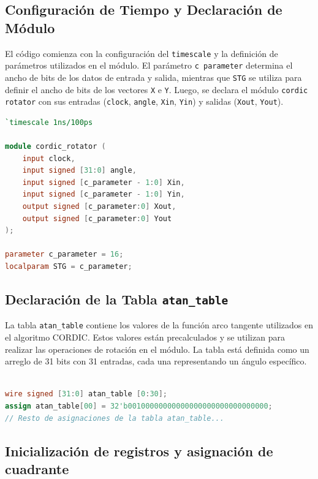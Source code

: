 \documentclass[12pt,a4paper, twoside]{article} %
\begin{document}
\subsection{Configuración de Tiempo y Declaración de Módulo}

El código comienza con la configuración del \texttt{timescale} y la definición de parámetros utilizados en el módulo. El parámetro \texttt{c parameter} determina el ancho de bits de los datos de entrada y salida, mientras que \texttt{STG} se utiliza para definir el ancho de bits de los vectores \texttt{X} e \texttt{Y}. Luego, se declara el módulo \texttt{cordic rotator} con sus entradas (\texttt{clock}, \texttt{angle}, \texttt{Xin}, \texttt{Yin}) y salidas (\texttt{Xout}, \texttt{Yout}).

\begin{lstlisting}[language=Verilog]
`timescale 1ns/100ps

module cordic_rotator (
    input clock,
    input signed [31:0] angle,
    input signed [c_parameter - 1:0] Xin,
    input signed [c_parameter - 1:0] Yin,
    output signed [c_parameter:0] Xout,
    output signed [c_parameter:0] Yout
);

parameter c_parameter = 16;
localparam STG = c_parameter;
\end{lstlisting}

\subsection{Declaración de la Tabla \texttt{atan\_table}}

La tabla \texttt{atan\_table} contiene los valores de la función arco tangente utilizados en el algoritmo CORDIC. Estos valores están precalculados y se utilizan para realizar las operaciones de rotación en el módulo. La tabla está definida como un arreglo de 31 bits con 31 entradas, cada una representando un ángulo específico.

\begin{lstlisting}[language=Verilog]

wire signed [31:0] atan_table [0:30];
assign atan_table[00] = 32'b00100000000000000000000000000000; 
// Resto de asignaciones de la tabla atan_table...

\end{lstlisting}

\subsection{Inicialización de registros y asignación de cuadrante}
\end{document}
